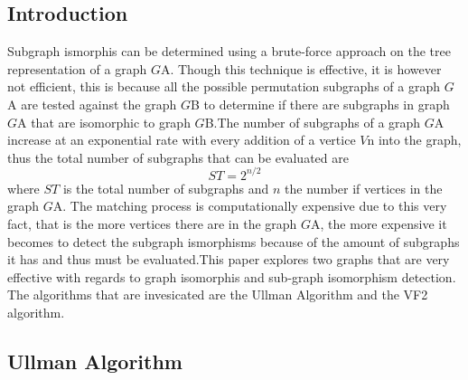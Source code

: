 \label{Search Matching Algorithm}


\subsection{Introduction}
Subgraph ismorphis can be determined using a brute-force approach on the tree representation of a graph $G${\tiny A}. Though this technique is effective, it is however not efficient, this is because all the possible permutation subgraphs of a graph $G${\tiny A} are tested against the graph $G${\tiny B} to determine if there are subgraphs in graph $G${\tiny A} that are isomorphic to graph $G${\tiny B}.The number of subgraphs of a graph $G${\tiny A} increase at an exponential rate with every addition of a vertice $V${\tiny n} into the graph, thus the total number of subgraphs that can be evaluated are  
	\begin{equation}
		ST = 2^{n/2}
	\end{equation} where $ST$ is the total number of subgraphs and $n$ the number if vertices in the graph $G${\tiny A}.\newline\newline
The matching process is computationally expensive due to this very fact, that is the more vertices there are in the graph $G${\tiny A}, the more expensive it becomes to detect the subgraph ismorphisms because of the amount of subgraphs it has and thus must be evaluated.\newline\newline This paper explores two graphs that are very effective with regards to graph isomorphis and sub-graph isomorphism detection. The algorithms that are invesicated are the Ullman Algorithm and the VF2 algorithm. \newpage

\subsection{Ullman Algorithm}
\label{Ullman Algorithm}

